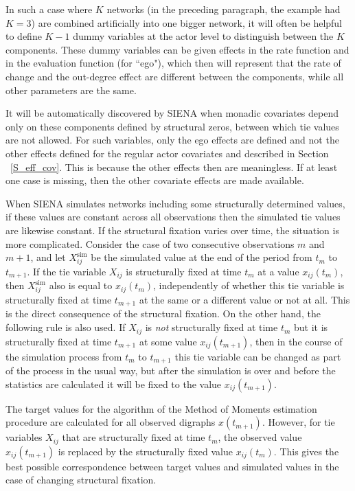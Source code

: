\documentclass[a4paper,fleqn,11pt]{article}
\newcommand{\+}{\, + \,}
\newcommand{\SI}{{\sf SIENA }}
\begin{document}
In such a case where $K$ networks (in the preceding paragraph, the
example had $K = 3$) are combined artificially into one bigger
network, it will often be helpful to define $K-1$ dummy variables
at the actor level to distinguish between the $K$ components.
These dummy variables can be given effects in the rate function
and in the evaluation function (for ``ego"), which then will
represent that the rate of change and the out-degree effect are
different between the components, while all other parameters are
the same.

It will be automatically discovered by \SI when monadic covariates
depend only on these components defined by structural zeros,
between which tie values are not allowed.
For such variables, only the ego effects are defined
and not the other effects defined for the regular
actor covariates and described in Section ~\ref{S_eff_cov}.
This is because the other effects then are meaningless.
If at least one case is missing,
then the other covariate effects are made available.

When \SI simulates networks including some structurally determined values,
if these values are constant across all observations then
the simulated tie values are likewise constant.
If the structural fixation varies over time, the situation
is more complicated.
Consider the case of two consecutive observations
$m$ and $m+1$,
and let $X^{\text{sim}}_{ij}$ be the simulated value
at the end of the period from $t_m$ to $t_{m+1}$.
If the tie variable $X_{ij}$ is structurally fixed at time $t_m$
at a value $x_{ij}(t_m)$,
then $X^{\text{sim}}_{ij}$ also is equal to $x_{ij}(t_m)$,
independently of whether this tie variable is structurally fixed
at time $t_{m+1}$ at the same or a different value or not at all.
This is the direct consequence of the structural fixation.
On the other hand, the following rule is also used.
If $X_{ij}$ is \emph{not} structurally fixed at time $t_m$
but it is structurally fixed at time $t_{m+1}$ at some value $x_{ij}(t_{m+1})$,
then in the course of the simulation process from  $t_m$ to $t_{m+1}$
this tie variable can be changed as part of the process in the usual way,
but after the simulation is over and before the statistics are calculated it will be fixed
to the value $x_{ij}(t_{m+1})$.

The target values for the algorithm of the Method of Moments estimation
procedure are calculated for all observed digraphs $x(t_{m+1})$.
However, for tie variables $X_{ij}$ that are
structurally fixed at time $t_m$, the observed value  $x_{ij}(t_{m+1})$
is replaced by the structurally fixed value  $x_{ij}(t_{m})$.
This gives the best possible correspondence between target values
and simulated values in the case of changing structural fixation.
\end{document}

